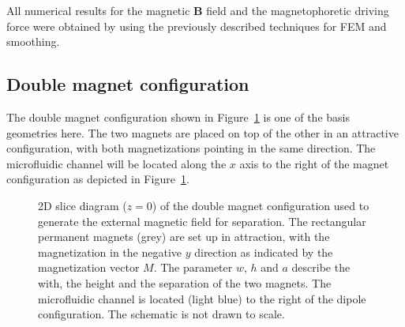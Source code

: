 All numerical results for the magnetic $\mathbf{B}$ field and the magnetophoretic driving force were obtained by using the previously described techniques for FEM and smoothing.  

\subsection{Double magnet configuration}\label{subsec:doubleMagnetConfiguration}
The double magnet configuration shown in Figure~\ref{fig:doubleMagnetConfiguration} is one of the basis geometries here. The two magnets are placed on top of the other in an attractive configuration, with both magnetizations pointing in the same direction. The microfluidic channel will be located along the $x$ axis to the right of the magnet configuration as depicted in Figure~\ref{fig:doubleMagnetConfiguration}. 

\begin{figure}[htb]%
\centering
{}
\caption[2D diagram of the double magnet configuration]{2D slice diagram ($z=0$) of the double magnet configuration used to generate the external magnetic field for separation. The rectangular permanent magnets (grey) are set up in attraction, with the magnetization in the negative $y$ direction as indicated by the magnetization vector $M$. The parameter $w$, $h$ and $a$ describe the with, the height and the separation of the two magnets. The microfluidic channel is located (light blue) to the right of the dipole configuration. The schematic is not drawn to scale.}%
\label{fig:doubleMagnetConfiguration}%
\end{figure}


